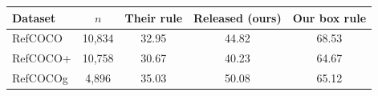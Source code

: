 \begin{tabular}{lcccc}
\toprule
Dataset & $n$ & Their rule & Released (ours) & Our box rule \\
\midrule
RefCOCO & 10,834 & 32.95 & 44.82 & 68.53 \\
RefCOCO+ & 10,758 & 30.67 & 40.23 & 64.67 \\
RefCOCOg & 4,896 & 35.03 & 50.08 & 65.12 \\
\bottomrule
\end{tabular}
